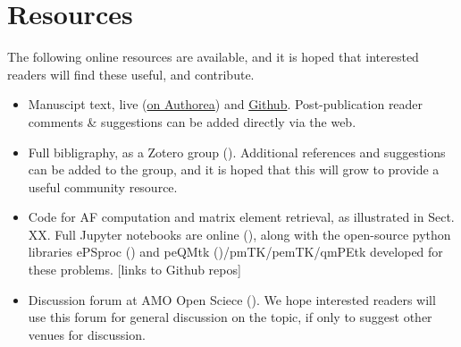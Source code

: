 \section{Resources}\label{sec:resources}

The following online resources are available, and it is hoped that interested readers will find these useful, and contribute.

\begin{itemize}
\item Manuscipt text, live (\href{https://www.authorea.com/users/71114/articles/447808-extracting-molecular-frame-photoionization-dynamics-from-experimental-data}{on Authorea}) and \href{https://github.com/phockett/Extracting-Molecular-Frame-Photoionization-Dynamics-from-Experimental-Data}{Github}. Post-publication reader comments \& suggestions can be added directly via the web.
\item Full bibligraphy, as a Zotero group (). Additional references and suggestions can be added to the group, and it is hoped that this will grow to provide a useful community resource.
\item Code for AF computation and matrix element retrieval, as illustrated in Sect. XX. Full Jupyter notebooks are online (), along with the open-source python libraries ePSproc () and peQMtk ()/pmTK/pemTK/qmPEtk developed for these problems. [links to Github repos]
\item Discussion forum at AMO Open Sciece (). We hope interested readers will use this forum for general discussion on the topic, if only to suggest other venues for discussion.
\end{itemize}